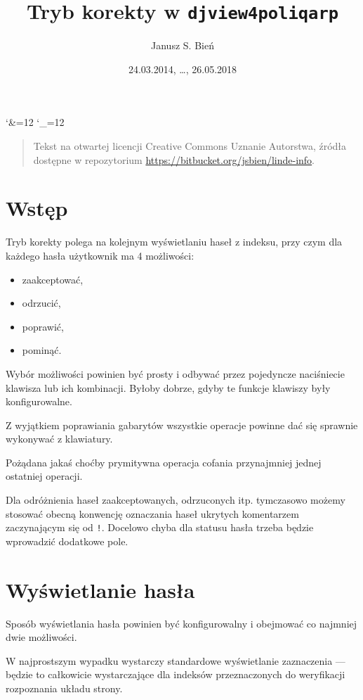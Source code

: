 \documentclass[12]{mwart}
\title{Tryb korekty w \texttt{djview4poliqarp}}
\author{Janusz S. Bień}
\date{24.03.2014, \ldots, 26.05.2018}
\begin{document}
\maketitle

\catcode`\&=12
\catcode`\_=12

\begin{quote}
  Tekst na otwartej licencji Creative Commons Uznanie Autorstwa,
  źródła dostępne w repozytorium
  \url{https://bitbucket.org/jsbien/linde-info}.
\end{quote}

\section{Wstęp}
\label{sec:wstp}

Tryb korekty polega na kolejnym wyświetlaniu haseł z indeksu, przy
czym dla każdego hasła użytkownik ma 4 możliwości:
\begin{itemize}
\item zaakceptować,
\item odrzucić,
\item poprawić,
\item pominąć.
\end{itemize}

Wybór możliwości powinien być prosty i odbywać przez pojedyncze
naciśniecie klawisza lub ich kombinacji. Byłoby dobrze, gdyby te
funkcje klawiszy były konfigurowalne.

Z wyjątkiem poprawiania gabarytów wszystkie operacje powinne dać się
sprawnie wykonywać z klawiatury.

Pożądana jakaś choćby prymitywna operacja cofania przynajmniej jednej
ostatniej operacji.

Dla odróżnienia haseł zaakceptowanych, odrzuconych itp. tymczasowo
możemy stosować obecną konwencję oznaczania haseł ukrytych komentarzem
zaczynającym się od \texttt{!}. Docelowo chyba dla statusu hasła
trzeba będzie wprowadzić dodatkowe pole.

\section{Wyświetlanie hasła}
\label{sec:wywietlanie-hasa}

Sposób wyświetlania hasła powinien być konfigurowalny i obejmować co
najmniej dwie możliwości.

W najprostszym wypadku wystarczy standardowe wyświetlanie zaznaczenia
--- będzie to całkowicie wystarczające dla indeksów przeznaczonych do
weryfikacji rozpoznania układu strony.
\end{document}

